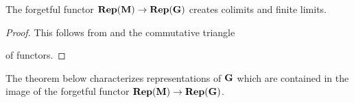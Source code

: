 \begin{fact}\label{fact:forgetful_from_reps_of_monoid_to_reps_of_units_creates_colimits_and_finite_limits}
The forgetful functor $\mathbf{Rep}(\mathbf{M})\rightarrow \mathbf{Rep}(\mathbf{G})$ creates colimits and finite limits.
\end{fact}
\begin{proof}
This follows from {\cite[Theorem 14.3, Theorem 14.4]{Monoid_k_functors}} and the commutative triangle
\begin{center}
\end{center}
of functors.
\end{proof}
\noindent
The theorem below characterizes representations of $\mathbf{G}$ which are contained in the image of the forgetful functor $\mathbf{Rep}(\mathbf{M})\rightarrow \mathbf{Rep}(\mathbf{G})$. 


